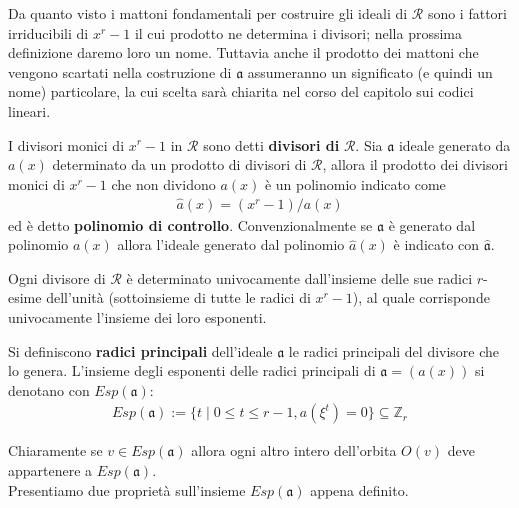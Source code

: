 Da quanto visto i mattoni fondamentali per costruire gli ideali di $\mathcal{R}$ sono i fattori irriducibili di $x^r-1$ il cui prodotto ne determina i divisori; nella prossima definizione daremo loro un nome. Tuttavia anche il prodotto dei mattoni che vengono scartati nella costruzione di $\mathfrak{a}$ assumeranno un significato (e quindi un nome) particolare, la cui scelta sarà chiarita nel corso del capitolo sui codici lineari.  
\begin{definizione}
   I divisori monici di $x^r - 1$ in $\mathcal{R}$ sono detti {\bf divisori di} $\mathcal{R}$. Sia $\mathfrak{a}$ ideale generato da $a(x)$ determinato da un prodotto di divisori di $\mathcal{R}$, allora il prodotto dei divisori monici di $x^r - 1$ che non dividono $a(x)$ è un polinomio indicato come 
   \begin{align*}
      \hat{a}(x) = (x^r-1)/a(x) 
   \end{align*}
   ed è detto {\bf polinomio di controllo}. Convenzionalmente se $\mathfrak{a}$ è generato dal polinomio $a(x)$ allora l'ideale generato dal polinomio $\hat{a}(x)$ è indicato con $\hat{\mathfrak{a}}$. 
\end{definizione} 
\noindent
Ogni divisore di $\mathcal{R}$ è determinato univocamente dall'insieme delle sue radici $r$-esime dell'unità (sottoinsieme di tutte le radici di $x^r -1$), al quale corrisponde univocamente l'insieme dei loro esponenti.
\begin{definizione} 
   Si definiscono {\bf radici principali} dell'ideale $\mathfrak{a}$ le radici principali del divisore che lo genera. L'insieme degli esponenti delle radici principali di $\mathfrak{a} = (a(x))$ si denotano con $Esp(\mathfrak{a})$:
   \begin{align*}
      Esp(\mathfrak{a}) := \lbrace t \mid 0\leq t \leq r-1, a(\xi^{t}) = 0 \rbrace \subseteq \mathbb{Z}_{r}
   \end{align*}
\end{definizione}
\noindent
Chiaramente se $v \in Esp(\mathfrak{a})$ allora ogni altro intero dell'orbita $O(v)$ deve appartenere a $Esp(\mathfrak{a})$.
\\
Presentiamo due proprietà sull'insieme $Esp(\mathfrak{a})$ appena definito. 

